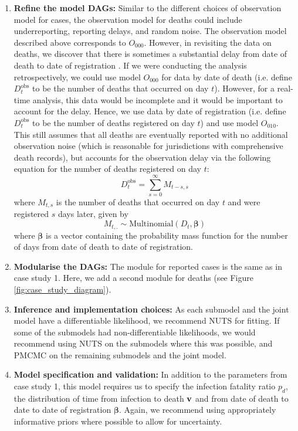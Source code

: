 \documentclass{article}
\begin{document}
\begin{enumerate}
\item \textbf{Refine the model DAGs:}       
    Similar to the different choices of observation model for cases, the observation model for deaths could include underreporting, reporting delays, and random noise. The observation model described above corresponds to $O_{000}$. However, in revisiting the data on deaths, we discover that there is sometimes a substantial delay from date of death to date of registration \citep{seaman2022nowcasting}. If we were conducting the analysis retrospectively, we could use model $O_{000}$ for data by date of death (i.e. define $D^\mathrm{obs}_t$ to be the number of deaths that occurred on day $t$). However, for a real-time analysis, this data would be incomplete and it would be important to account for the delay. Hence, we use data by date of registration (i.e. define $D^\mathrm{obs}_t$ to be the number of deaths registered on day $t$) and use model $O_{010}$. This still assumes that all deaths are eventually reported with no additional observation noise (which is reasonable for jurisdictions with comprehensive death records), but accounts for the observation delay via the following equation for the number of deaths registered on day $t$:
\begin{equation}
    D^\mathrm{obs}_t = \sum_{s=0}^\infty M_{t-s,s}
\end{equation}
where $M_{t,s}$ is the number of deaths that occurred on day $t$ and were registered $s$ days later, given by
\begin{equation}
    M_{t,.} \sim \mathrm{Multinomial}\left( D_t, \boldsymbol{\beta}\right) 
\end{equation}
where $\boldsymbol{\beta}$ is a vector containing the probability mass function for the number of days from date of death to date of registration.

 \item \textbf{Modularise the DAGs:} The module for reported cases is the same as in case study 1. Here, we add a second module for deaths (see Figure \ref{fig:case_study_diagram}).

\item \textbf{Inference and implementation choices:} As each submodel and the joint model have a differentiable likelihood, we recommend NUTS for fitting. If some of the submodels had non-differentiable likelihoods, we would recommend using NUTS on the submodels where this was possible, and PMCMC on the remaining submodels and the joint model.

\item \textbf{Model specification and validation:} In addition to the parameters from case study 1, this model requires us to specify the infection fatality ratio $p_d$, the distribution of time from infection to death $\bf{v}$ and from date of death to date to date of registration $\boldsymbol{\beta}$. Again, we recommend using appropriately informative priors where possible to allow for uncertainty. 



\end{enumerate}
\end{document}
